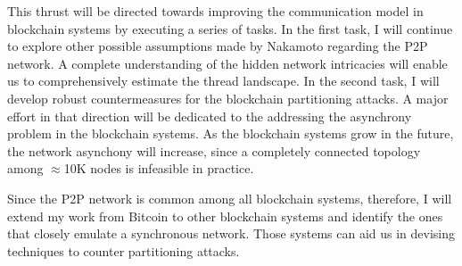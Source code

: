 \documentclass{NSF}
\begin{document}
This thrust will be directed towards improving the communication model in blockchain systems by executing a series of tasks. In the first task, I will continue to explore other possible assumptions made by Nakamoto regarding the P2P network. A complete understanding of the hidden network intricacies will enable us to comprehensively estimate the thread landscape. In the second task, I will develop robust countermeasures for the blockchain partitioning attacks. A major effort in that direction will be dedicated to the addressing the asynchrony problem in the blockchain systems. As the blockchain systems grow in the future, the network asynchony will increase, since a completely connected topology among $\approx$10K nodes is infeasible in practice. 

Since the P2P network is common among all blockchain systems, therefore, I will extend my work from Bitcoin to other blockchain systems and identify the ones that closely emulate a synchronous network. Those systems can aid us in devising techniques to counter partitioning attacks. 

\vspace{2mm}
\end{document}
